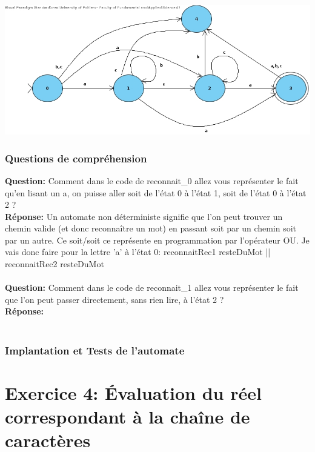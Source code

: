 \documentclass[./standalone.tex]{subfiles}
\begin{document}
\begin{center}
	\includegraphics[scale=0.5]{../VP/ex3.jpg}
\end{center}

\subsubsection{Questions de compréhension}
\medskip

\textbf{Question:} Comment dans le code de reconnait\_0 allez vous représenter le fait qu'en lisant un a, on puisse aller soit de l'état 0 à l'état 1, soit de l'état 0 à l'état 2 ?\\

\textbf{Réponse:} Un automate non déterministe signifie que l'on peut trouver un chemin valide (et donc reconnaître un mot) en passant soit par un chemin soit par un autre. Ce soit/soit ce représente en programmation par l'opérateur OU. Je vais donc faire pour la lettre 'a' à l'état 0: reconnaitRec1 resteDuMot || reconnaitRec2 resteDuMot\\\\


\textbf{Question:} Comment dans le code de reconnait\_1 allez vous représenter le fait que l'on peut passer directement, sans rien lire, à l'état 2 ?\\

\textbf{Réponse:} \\\\

\subsubsection{Implantation et Tests de l'automate}
\newpage




\section{Exercice 4: Évaluation du réel correspondant à la chaîne de caractères}
\bigskip
\end{document}
